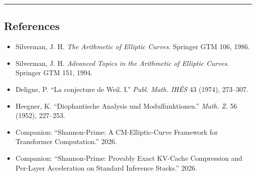 \documentclass[
  11pt,
]{article}
\providecommand{\tightlist}{%
  \setlength{\itemsep}{0pt}\setlength{\parskip}{0pt}}
\begin{document}
\begin{center}\rule{0.5\linewidth}{0.5pt}\end{center}

\hypertarget{references}{%
\subsection{References}\label{references}}

\begin{itemize}
\tightlist
\item
  Silverman, J. H. \emph{The Arithmetic of Elliptic Curves}. Springer
  GTM 106, 1986.
\item
  Silverman, J. H. \emph{Advanced Topics in the Arithmetic of Elliptic
  Curves}. Springer GTM 151, 1994.
\item
  Deligne, P. ``La conjecture de Weil. I.'' \emph{Publ. Math. IHÉS} 43
  (1974), 273--307.
\item
  Heegner, K. ``Diophantische Analysis und Modulfunktionen.''
  \emph{Math. Z.} 56 (1952), 227--253.
\item
  Companion: ``Shannon-Prime: A CM-Elliptic-Curve Framework for
  Transformer Computation.'' 2026.
\item
  Companion: ``Shannon-Prime: Provably Exact KV-Cache Compression and
  Per-Layer Acceleration on Standard Inference Stacks.'' 2026.
\end{itemize}
\end{document}
